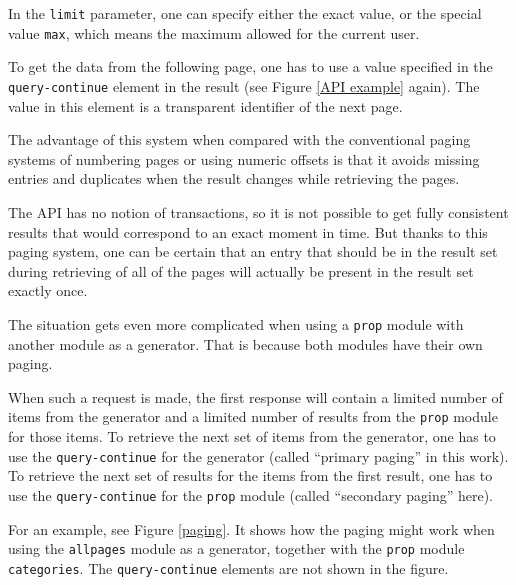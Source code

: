 In the \texttt{limit} parameter, one can specify either the exact value,
or the special value \texttt{max}, which means the maximum allowed for the current user.

To get the data from the following page, one has to use a value specified in the \texttt{query-continue}
element in the result (see Figure \ref{API example} again).
The value in this element is a transparent identifier of the next page.

The advantage of this system when compared with the conventional paging systems of numbering pages
or using numeric offsets is that it avoids missing entries and duplicates when the result
changes while retrieving the pages.

The API has no notion of transactions, so it is not possible to get fully consistent results
that would correspond to an exact moment in time.
But thanks to this paging system, one can be certain that an entry that should be in the result set
during retrieving of all of the pages will actually be present in the result set exactly once.

The situation gets even more complicated when using a \texttt{prop} module with another module as a generator.
That is because both modules have their own paging.

When such a request is made, the first response will contain a limited number of items from the generator
and a limited number of results from the \texttt{prop} module for those items.
To retrieve the next set of items from the generator, one has to use the \texttt{query-continue} for the generator
(called ``primary paging'' in this work).
To retrieve the next set of results for the items from the first result,
one has to use the \texttt{query-continue} for the \texttt{prop} module (called ``secondary paging'' here).

For an example, see Figure \ref{paging}.
It shows how the paging might work when using the \texttt{allpages} module as a generator,
together with the \texttt{prop} module \texttt{categories}.
The \texttt{query-continue} elements are not shown in the figure.

